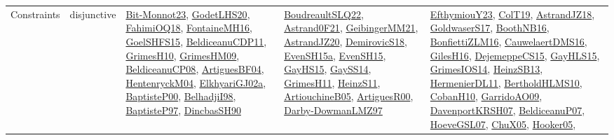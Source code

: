 {\begin{longtable}{lp{3cm}>{\raggedright}p{6cm}>{\raggedright}p{6cm}p{8cm}}
Constraints & disjunctive & \href{papers/Bit-Monnot23.pdf}{Bit-Monnot23}\cite{Bit-Monnot23}, \href{papers/GodetLHS20.pdf}{GodetLHS20}\cite{GodetLHS20}, \href{articles/FahimiOQ18.pdf}{FahimiOQ18}\cite{FahimiOQ18}, \href{papers/FontaineMH16.pdf}{FontaineMH16}\cite{FontaineMH16}, \href{articles/GoelSHFS15.pdf}{GoelSHFS15}\cite{GoelSHFS15}, \href{articles/BeldiceanuCDP11.pdf}{BeldiceanuCDP11}\cite{BeldiceanuCDP11}, \href{papers/GrimesH10.pdf}{GrimesH10}\cite{GrimesH10}, \href{papers/GrimesHM09.pdf}{GrimesHM09}\cite{GrimesHM09}, \href{papers/BeldiceanuCP08.pdf}{BeldiceanuCP08}\cite{BeldiceanuCP08}, \href{papers/ArtiguesBF04.pdf}{ArtiguesBF04}\cite{ArtiguesBF04}, \href{papers/HentenryckM04.pdf}{HentenryckM04}\cite{HentenryckM04}, \href{papers/ElkhyariGJ02a.pdf}{ElkhyariGJ02a}\cite{ElkhyariGJ02a}, \href{articles/BaptisteP00.pdf}{BaptisteP00}\cite{BaptisteP00}, \href{articles/BelhadjiI98.pdf}{BelhadjiI98}\cite{BelhadjiI98}, \href{papers/BaptisteP97.pdf}{BaptisteP97}\cite{BaptisteP97}, \href{articles/DincbasSH90.pdf}{DincbasSH90}\cite{DincbasSH90} & \href{papers/BoudreaultSLQ22.pdf}{BoudreaultSLQ22}\cite{BoudreaultSLQ22}, \href{papers/Astrand0F21.pdf}{Astrand0F21}\cite{Astrand0F21}, \href{papers/GeibingerMM21.pdf}{GeibingerMM21}\cite{GeibingerMM21}, \href{articles/AstrandJZ20.pdf}{AstrandJZ20}\cite{AstrandJZ20}, \href{papers/DemirovicS18.pdf}{DemirovicS18}\cite{DemirovicS18}, \href{articles/EvenSH15a.pdf}{EvenSH15a}\cite{EvenSH15a}, \href{papers/EvenSH15.pdf}{EvenSH15}\cite{EvenSH15}, \href{papers/GayHS15.pdf}{GayHS15}\cite{GayHS15}, \href{papers/GaySS14.pdf}{GaySS14}\cite{GaySS14}, \href{papers/GrimesH11.pdf}{GrimesH11}\cite{GrimesH11}, \href{papers/HeinzS11.pdf}{HeinzS11}\cite{HeinzS11}, \href{papers/ArtiouchineB05.pdf}{ArtiouchineB05}\cite{ArtiouchineB05}, \href{articles/ArtiguesR00.pdf}{ArtiguesR00}\cite{ArtiguesR00}, \href{articles/Darby-DowmanLMZ97.pdf}{Darby-DowmanLMZ97}\cite{Darby-DowmanLMZ97} & \href{papers/EfthymiouY23.pdf}{EfthymiouY23}\cite{EfthymiouY23}, \href{papers/ColT19.pdf}{ColT19}\cite{ColT19}, \href{papers/AstrandJZ18.pdf}{AstrandJZ18}\cite{AstrandJZ18}, \href{papers/GoldwaserS17.pdf}{GoldwaserS17}\cite{GoldwaserS17}, \href{papers/BoothNB16.pdf}{BoothNB16}\cite{BoothNB16}, \href{papers/BonfiettiZLM16.pdf}{BonfiettiZLM16}\cite{BonfiettiZLM16}, \href{papers/CauwelaertDMS16.pdf}{CauwelaertDMS16}\cite{CauwelaertDMS16}, \href{papers/GilesH16.pdf}{GilesH16}\cite{GilesH16}, \href{papers/DejemeppeCS15.pdf}{DejemeppeCS15}\cite{DejemeppeCS15}, \href{papers/GayHLS15.pdf}{GayHLS15}\cite{GayHLS15}, \href{articles/GrimesIOS14.pdf}{GrimesIOS14}\cite{GrimesIOS14}, \href{articles/HeinzSB13.pdf}{HeinzSB13}\cite{HeinzSB13}, \href{papers/HermenierDL11.pdf}{HermenierDL11}\cite{HermenierDL11}, \href{papers/BertholdHLMS10.pdf}{BertholdHLMS10}\cite{BertholdHLMS10}, \href{papers/CobanH10.pdf}{CobanH10}\cite{CobanH10}, \href{articles/GarridoAO09.pdf}{GarridoAO09}\cite{GarridoAO09}, \href{papers/DavenportKRSH07.pdf}{DavenportKRSH07}\cite{DavenportKRSH07}, \href{papers/BeldiceanuP07.pdf}{BeldiceanuP07}\cite{BeldiceanuP07}, \href{papers/HoeveGSL07.pdf}{HoeveGSL07}\cite{HoeveGSL07}, \href{papers/ChuX05.pdf}{ChuX05}\cite{ChuX05}, \href{articles/Hooker05.pdf}{Hooker05}\cite{Hooker05}, 
\end{longtable}}
